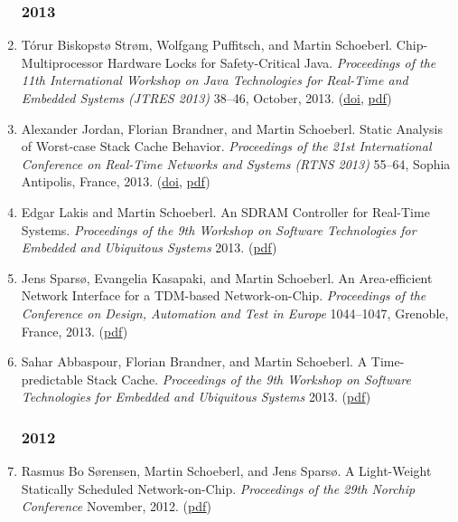 \begin{enumerate}
\subsubsection*{2013}

\item T{\'o}rur Biskopst{\o} Str{\o}m, Wolfgang Puffitsch, and Martin Schoeberl.
 Chip-Multiprocessor Hardware Locks for Safety-Critical Java.
 \emph{Proceedings of the 11th International Workshop on Java Technologies for Real-Time and Embedded Systems (JTRES 2013)} 38--46, October, 2013.
(\href{http://dx.doi.org/10.1145/2512989.2512995}{doi}, \href{http://www.jopdesign.com/doc/cmphwlocks.pdf}{pdf})

\item Alexander Jordan, Florian Brandner, and Martin Schoeberl.
 Static Analysis of Worst-case Stack Cache Behavior.
 \emph{Proceedings of the 21st International Conference on Real-Time Networks and Systems (RTNS 2013)} 55--64, Sophia Antipolis, France, 2013.
(\href{http://dx.doi.org/10.1145/2516821.2516828}{doi}, \href{http://doi.acm.org/10.1145/2516821.2516828}{pdf})

\item Edgar Lakis and Martin Schoeberl.
 An SDRAM Controller for Real-Time Systems.
 \emph{Proceedings of the 9th Workshop on Software Technologies for Embedded and Ubiquitous Systems} 2013.
(\href{http://www.jopdesign.com/doc/sdramctrl.pdf}{pdf})

\item Jens Spars{\o}, Evangelia Kasapaki, and Martin Schoeberl.
 An Area-efficient Network Interface for a TDM-based Network-on-Chip.
 \emph{Proceedings of the Conference on Design, Automation and Test in Europe} 1044--1047, Grenoble, France, 2013.
(\href{http://www.jopdesign.com/doc/tdmna-date2012.pdf}{pdf})

\item Sahar Abbaspour, Florian Brandner, and Martin Schoeberl.
 A Time-predictable Stack Cache.
 \emph{Proceedings of the 9th Workshop on Software Technologies for Embedded and Ubiquitous Systems} 2013.
(\href{http://www.jopdesign.com/doc/patstack.pdf}{pdf})


\subsubsection*{2012}

\item Rasmus Bo S{\o}rensen, Martin Schoeberl, and Jens Spars{\o}.
 A Light-Weight Statically Scheduled Network-on-Chip.
 \emph{Proceedings of the 29th Norchip Conference} November, 2012.
(\href{http://www.jopdesign.com/doc/s4noceval.pdf}{pdf})


\end{enumerate}
